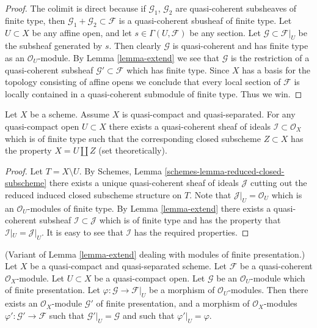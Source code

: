 \begin{proof}
The colimit is direct because if $\mathcal{G}_1$, $\mathcal{G}_2$
are quasi-coherent subsheaves of finite type, then
$\mathcal{G}_1 + \mathcal{G}_2 \subset \mathcal{F}$ is
a quasi-coherent sbusheaf of finite type.
Let $U \subset X$ be any affine open, and let
$s \in \Gamma(U, \mathcal{F})$ be any section.
Let $\mathcal{G} \subset \mathcal{F}|_U$ be the
subsheaf generated by $s$. Then clearly $\mathcal{G}$
is quasi-coherent and has finite type as an $\mathcal{O}_U$-module.
By Lemma \ref{lemma-extend} we see that $\mathcal{G}$ is the restriction
of a quasi-coherent subsheaf $\mathcal{G}' \subset \mathcal{F}$
which has finite type. Since $X$ has a basis for the topology consisting
of affine opens we conclude that every local section of
$\mathcal{F}$ is locally contained in a quasi-coherent submodule
of finite type. Thus we win.
\end{proof}

\begin{lemma}
\label{lemma-quasi-coherent-finite-type-ideals}
Let $X$ be a scheme.
Assume $X$ is quasi-compact and quasi-separated.
For any quasi-compact open $U \subset X$ there exists
a quasi-coherent sheaf of ideals $\mathcal{I} \subset \mathcal{O}_X$
which is of finite type such that the corresponding closed
subscheme $Z \subset X$ has the property $X = U \coprod Z$
(set theoretically).
\end{lemma}

\begin{proof}
Let $T = X \setminus U$. By
Schemes, Lemma \ref{schemes-lemma-reduced-closed-subscheme} there exists
a unique quasi-coherent sheaf of ideals $\mathcal{J}$ cutting
out the reduced induced closed subscheme structure on $T$.
Note that $\mathcal{J}|_U = \mathcal{O}_U$ which is an
$\mathcal{O}_U$-modules of finite type.
By Lemma \ref{lemma-extend} there exists a quasi-coherent subsheaf
$\mathcal{I} \subset \mathcal{J}$ which is of finite type
and has the property that $\mathcal{I}|_U = \mathcal{J}|_U$.
It is easy to see that $\mathcal{I}$ has the required properties.
\end{proof}

\begin{lemma}
\label{lemma-extend-finite-presentation}
(Variant of Lemma \ref{lemma-extend} dealing with modules of
finite presentation.)
Let $X$ be a quasi-compact and quasi-separated scheme.
Let $\mathcal{F}$ be a quasi-coherent $\mathcal{O}_X$-module.
Let $U \subset X$ be a quasi-compact open.
Let $\mathcal{G}$ be an $\mathcal{O}_U$-module which of finite presentation.
Let $\varphi : \mathcal{G} \to \mathcal{F}|_U$ be a morphism of
$\mathcal{O}_U$-modules.
Then there exists an $\mathcal{O}_X$-module
$\mathcal{G}'$ of finite presentation, and a morphism
of $\mathcal{O}_X$-modules $\varphi' : \mathcal{G}' \to \mathcal{F}$
such that $\mathcal{G}'|_U = \mathcal{G}$ and such that
$\varphi'|_U = \varphi$.
\end{lemma}

